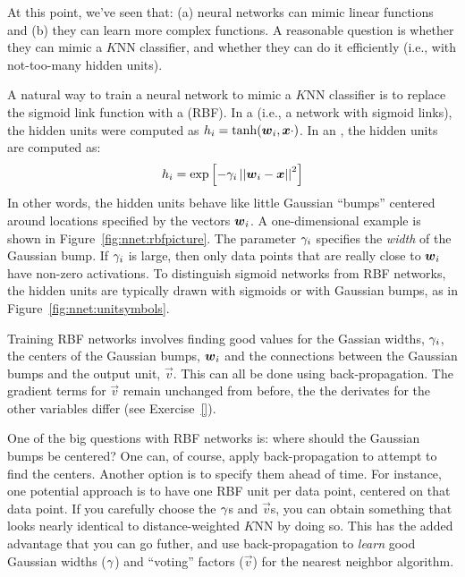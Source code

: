 At this point, we've seen that: (a) neural networks can mimic linear
functions and (b) they can learn more complex functions.  A reasonable
question is whether they can mimic a $K$NN classifier, and whether
they can do it efficiently (i.e., with not-too-many hidden units).

A natural way to train a neural network to mimic a $K$NN classifier is
to replace the sigmoid link function with a  (RBF).  In a  (i.e., a network
with sigmoid links), the hidden units were computed as $h_i =
\tanh({\boldsymbol{w}}_i,{\boldsymbol{x}} \cdot )$.  In an , the hidden
units are computed as:
%
\begin{equation}
h_i = \exp\left[ - \gamma_i \left\vert\left\vert {\boldsymbol{w}}_i - {\boldsymbol{x}} \right\vert\right\vert^2 \right]
\end{equation}
%
%
In other words, the hidden units behave like little Gaussian ``bumps''
centered around locations specified by the vectors ${\boldsymbol{w}}_i$.  A
one-dimensional example is shown in Figure~\ref{fig:nnet:rbfpicture}.
The parameter $\gamma_i$ specifies the \emph{width} of the Gaussian bump.
If $\gamma_i$ is large, then only data points that are really close to
${\boldsymbol{w}}_i$ have non-zero activations.  To distinguish sigmoid networks
from RBF networks, the hidden units are typically drawn with sigmoids
or with Gaussian bumps, as in Figure~\ref{fig:nnet:unitsymbols}.

Training RBF networks involves finding good values for the Gassian
widths, $\gamma_i$, the centers of the Gaussian bumps, ${\boldsymbol{w}}_i$ and the
connections between the Gaussian bumps and the output unit, $\vec v$.
This can all be done using back-propagation.  The gradient terms for
$\vec v$ remain unchanged from before, the the derivates for the other
variables differ (see Exercise~\ref{}).

One of the big questions with RBF networks is: where should the
Gaussian bumps be centered?  One can, of course, apply
back-propagation to attempt to find the centers.  Another option is to
specify them ahead of time.  For instance, one potential approach is
to have one RBF unit per data point, centered on that data point.  If
you carefully choose the $\gamma$s and $\vec v$s, you can obtain
something that looks nearly identical to distance-weighted $K$NN by
doing so.  This has the added advantage that you can go futher, and
use back-propagation to \emph{learn} good Gaussian widths ($\gamma$) and
``voting'' factors ($\vec v$) for the nearest neighbor algorithm.

